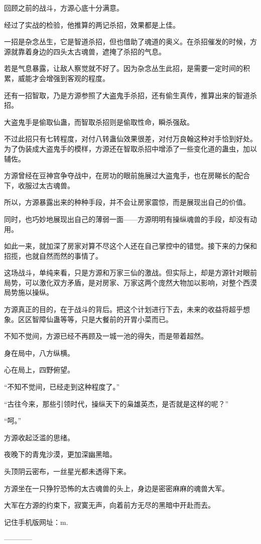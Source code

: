 \begin{this_body}
回顾之前的战斗，方源心底十分满意。

经过了实战的检验，他推算的两记杀招，效果都是上佳。

一招是杂念丛生，它是智道杀招，但也借助了魂道的奥义。在杀招催发的时候，方源就靠着身边的四头太古魂兽，遮掩了杀招的气息。

若是气息暴露，让敌人察觉就不好了。因为杂念丛生此招，是需要一定时间的积累，威能才会增强到客观的程度。

还有一招智取，乃是方源参照了大盗鬼手杀招，还有偷生真传，推算出来的智道杀招。

大盗鬼手是偷取仙蛊，而智取杀招则是偷取性命，瞬杀强敌。

不过此招只有七转程度，对付八转蛊仙效果很差，对付万良翰这种对手恰到好处。为了伪装成大盗鬼手的模样，方源还在智取杀招中增添了一些变化道的蛊虫，加以辅佐。

方源曾经在豆神宫争夺战中，在房功的眼前施展过大盗鬼手，也在房睇长的配合下，收服过太古魂兽。

所以，方源暴露出来的种种手段，并不会让房家震惊，而是展现出自己的价值。

同时，也巧妙地展现出自己的薄弱一面——方源明明有操纵魂兽的手段，却没有动用。

如此一来，就加深了房家对算不尽这个人还在自己掌控中的错觉。接下来的力保和招揽，也就自然而然的事情了。

这场战斗，单纯来看，只是方源和万家三仙的激战。但实际上，却是方源针对眼前局势，可以激化双方矛盾，是对房家、万家这两个庞然大物加以影响，对整个西漠局势施以操纵。

方源真正的目的，在于战斗的背后。把这个计划进行下去，未来的收益将超乎想象。区区智障仙蛊等等，只是大餐前的开胃小菜而已。

不知不觉间，方源已经不再顾及一城一池的得失，而是带着超然。

身在局中，八方纵横。

心在局上，四野俯望。

“不知不觉间，已经走到这种程度了。”

“古往今来，那些引领时代，操纵天下的枭雄英杰，是否就是这样的呢？”

“呵。”

方源收起泛滥的思绪。

夜晚下的青鬼沙漠，更加深幽黑暗。

头顶阴云密布，一丝星光都未透得下来。

方源坐在一只狰狞恐怖的太古魂兽的头上，身边是密密麻麻的魂兽大军。

大军在方源的约束下，寂寞无声，向着前方无尽的黑暗中开赴而去。

记住手机版网址：m.

------------

\end{this_body}

